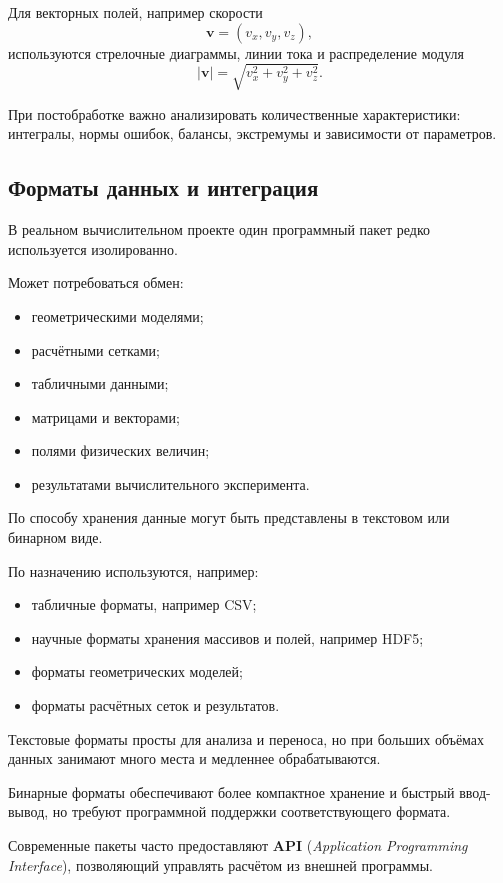 Для векторных полей, например скорости
\[
\mathbf{v}=(v_x,v_y,v_z),
\]
используются стрелочные диаграммы, линии тока и распределение модуля
\[
|\mathbf v|
=
\sqrt{v_x^2+v_y^2+v_z^2}.
\]

При постобработке важно анализировать количественные характеристики: интегралы, нормы ошибок, балансы, экстремумы и зависимости от параметров.

\subsection{Форматы данных и интеграция}

В реальном вычислительном проекте один программный пакет редко используется изолированно.

Может потребоваться обмен:
\begin{itemize}
	\item геометрическими моделями;
	\item расчётными сетками;
	\item табличными данными;
	\item матрицами и векторами;
	\item полями физических величин;
	\item результатами вычислительного эксперимента.
\end{itemize}

По способу хранения данные могут быть представлены в текстовом или бинарном виде.

По назначению используются, например:
\begin{itemize}
	\item табличные форматы, например CSV;
	\item научные форматы хранения массивов и полей, например HDF5;
	\item форматы геометрических моделей;
	\item форматы расчётных сеток и результатов.
\end{itemize}

Текстовые форматы просты для анализа и переноса, но при больших объёмах данных занимают много места и медленнее обрабатываются.

Бинарные форматы обеспечивают более компактное хранение и быстрый ввод-вывод, но требуют программной поддержки соответствующего формата.

Современные пакеты часто предоставляют \textbf{API} (\textit{Application Programming Interface}), позволяющий управлять расчётом из внешней программы.

